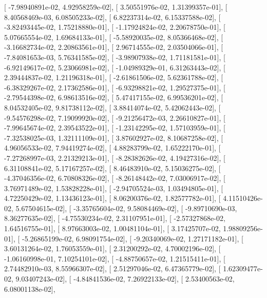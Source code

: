 \documentclass{article}
\begin{document}
       [ -7.98940891e-02,   4.92958259e-02],
       [  3.50551976e-02,   1.31399357e-01],
       [  8.40568469e-03,   6.08505233e-02],
       [  6.82237314e-02,   6.15337588e-02],
       [ -3.82493445e-02,   1.75218880e-01],
       [ -1.17924824e-02,   2.20678750e-01],
       [  5.07665554e-02,   1.69684133e-01],
       [ -5.58920035e-02,   8.05366468e-02],
       [ -3.16682734e-02,   2.20863561e-01],
       [  2.96714555e-02,   2.03504066e-01],
       [ -7.84081653e-03,   5.76341585e-02],
       [ -3.98907938e-02,   1.71181581e-01],
       [ -6.92149617e-02,   5.23066981e-02],
       [ -1.04989329e-01,   6.31263443e-02],
       [  2.39444837e-02,   1.21196318e-01],
       [ -2.61861506e-02,   5.62361788e-02],
       [ -6.38329267e-02,   2.17362586e-01],
       [ -6.93298821e-02,   1.29527375e-01],
       [ -2.79544398e-02,   6.98613516e-02],
       [  5.47417155e-02,   6.99536201e-02],
       [  8.04532405e-02,   9.81738112e-02],
       [  3.88414074e-02,   5.42062443e-02],
       [ -9.54576298e-02,   7.19099920e-02],
       [ -9.21256472e-03,   2.26610827e-01],
       [ -7.99645674e-02,   2.39543522e-01],
       [ -1.23142295e-02,   1.57103959e-01],
       [ -7.32538025e-03,   1.32111109e-01],
       [  3.87602927e-02,   8.10687258e-02],
       [  4.96056533e-02,   7.94419274e-02],
       [  4.88283799e-02,   1.65222170e-01],
       [ -7.27268997e-03,   2.21329213e-01],
       [ -8.28382626e-02,   4.19427316e-02],
       [  6.31108841e-02,   5.17167257e-02],
       [  8.46483910e-02,   5.15036275e-02],
       [ -4.37046356e-02,   6.70808326e-02],
       [ -8.26148442e-02,   7.03006917e-02],
       [  3.76971489e-02,   1.53828228e-01],
       [ -2.94705524e-03,   1.03494805e-01],
       [  4.72250429e-02,   1.13436123e-01],
       [  8.06200376e-02,   1.82577782e-01],
       [  4.11510426e-02,   5.67504615e-02],
       [ -3.35765604e-02,   9.58084469e-02],
       [ -9.89710690e-03,   8.36277635e-02],
       [ -4.75530234e-02,   2.31107951e-01],
       [ -2.57327868e-02,   1.64516755e-01],
       [  8.97663003e-02,   1.00481104e-01],
       [  3.17425707e-02,   1.98809256e-01],
       [ -5.26865199e-02,   6.98091754e-02],
       [ -9.20340069e-02,   1.27171182e-01],
       [  3.60131264e-02,   1.76053559e-01],
       [  2.31200292e-02,   4.70002196e-02],
       [ -1.06160998e-01,   7.10254101e-02],
       [ -4.88750657e-02,   1.21515411e-01],
       [  2.74482910e-03,   8.55966307e-02],
       [  2.51297046e-02,   6.47365779e-02],
       [  1.62309477e-02,   9.03407243e-02],
       [ -4.84841536e-02,   7.26922133e-02],
       [  2.53400563e-02,   6.08001138e-02],
\end{document}
